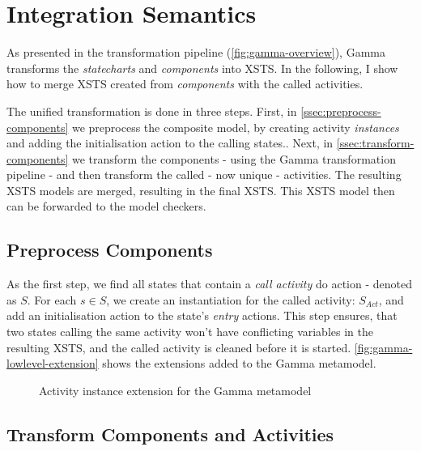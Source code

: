 \section{Integration Semantics}\label{sec:integration-semantics}

As presented in the transformation pipeline (\autoref{fig:gamma-overview}), Gamma transforms the \emph{statecharts} and \emph{components} into XSTS. In the following, I show how to merge XSTS created from \emph{components} with the called activities.

The unified transformation is done in three steps. First, in \autoref{ssec:preprocess-components} we preprocess the composite model, by creating activity \emph{instances} and adding the initialisation action to the calling states.. Next, in \autoref{ssec:transform-components} we transform the components - using the Gamma transformation pipeline - and then transform the called - now unique - activities. The resulting XSTS models are merged, resulting in the final XSTS. This XSTS model then can be forwarded to the model checkers.

\subsection{Preprocess Components}\label{ssec:preprocess-components}

As the first step, we find all states that contain a \emph{call activity} do action - denoted as \( S \). For each \(s \in S\), we create an instantiation for the called activity: \( S_\mathit{Act}\), and add an initialisation action to the state's \emph{entry} actions. This step ensures, that two states calling the same activity won't have conflicting variables in the resulting XSTS, and the called activity is cleaned before it is started. \autoref{fig:gamma-lowlevel-extension} shows the extensions added to the Gamma metamodel.


\begin{figure}[!ht]
	\centering
	
	\caption{Activity instance extension for the Gamma metamodel}
	\label{fig:gamma-lowlevel-extension}
\end{figure}

\subsection{Transform Components and Activities}\label{ssec:transform-components}

